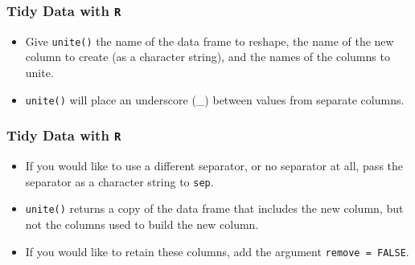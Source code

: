 \documentclass[TIDYMASTER.tex]{subfiles}
\begin{document}
\begin{frame}[fragile]
\frametitle{Tidy Data with \texttt{R}}
\Large

\begin{itemize}
\item Give \texttt{unite()} the name of the data frame to reshape, the name of the new column to create (as a character string), and the names of the columns to unite. 
\bigskip
\item \texttt{unite()} will place an underscore (\_) between values from separate columns. 
\end{itemize}

\end{frame}
\begin{frame}[fragile]
	\frametitle{Tidy Data with \texttt{R}}
	\Large
	
	\begin{itemize}
\item If you would like to use a different separator, or no separator at all, pass the separator as a character string to \texttt{sep}.
\bigskip
\item \texttt{unite()} returns a copy of the data frame that includes the new column, but not the columns used to build the new column.  \bigskip
\item If you would like to retain these columns, add the argument \texttt{remove = FALSE}.
\end{itemize}

\end{frame}
%
%
\end{document}
